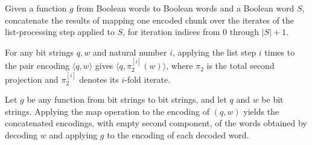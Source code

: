 \begin{definition}
\label{Complexity.BinArith.mapW}
\leanok
{}
Given a function $g$ from Boolean words to Boolean words and a Boolean word $S$,
concatenate the results of mapping one encoded chunk over the iterates of the
list-processing step applied to $S$, for iteration indices from $0$ through $|S|+1$.
\end{definition}

\begin{theorem}
\label{Complexity.BinArith.iterate_listStep}
\leanok
{}
For any bit strings $q,w$ and natural number $i$, applying the list step $i$ times to
the pair encoding $\langle q,w\rangle$ gives $\langle q,\pi_2^{[i]}(w)\rangle$, where
$\pi_2$ is the total second projection and $\pi_2^{[i]}$ denotes its $i$-fold iterate.
\end{theorem}

\begin{theorem}
\label{Complexity.BinArith.mapW_pairEncode}
\leanok
{}
Let $g$ be any function from bit strings to bit strings, and let $q$ and $w$ be bit
strings. Applying the map operation to the encoding of $(q,w)$ yields the concatenated
encodings, with empty second component, of the words obtained by decoding $w$ and
applying $g$ to the encoding of each decoded word.
\end{theorem}

